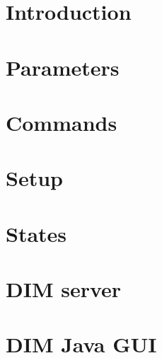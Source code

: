 
\chapter{Introduction}
 \cleardoublepage
\chapter{Parameters}
 \cleardoublepage
\chapter{Commands}
 \cleardoublepage
\chapter{Setup}
 \cleardoublepage
\chapter{States}
 \cleardoublepage
\chapter{DIM server}
 \cleardoublepage
\chapter{DIM Java GUI}
 \cleardoublepage

